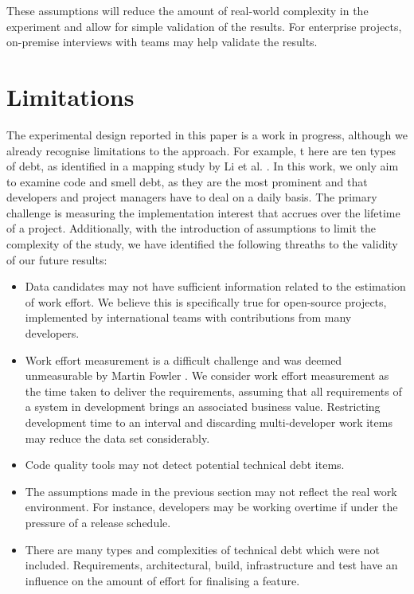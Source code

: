 These assumptions will reduce the amount of real-world complexity in the
experiment and allow for simple validation of the results. For enterprise
projects, on-premise interviews with teams may help validate the results.

\section{Limitations}
\label{limitations}

The experimental design reported in this paper is a work in progress, although
we already recognise limitations to the approach.  For example, t here are ten
types of debt, as identified in a mapping study by Li et al.  \cite{Li2015}. In
this work, we only aim to examine code and smell debt, as they are the most
prominent and that developers and project managers have to deal on a daily
basis. The primary challenge is measuring the implementation interest that
accrues over the lifetime of a project. Additionally, with the introduction of
assumptions to limit the complexity of the study, we have identified the
following threaths to the validity of our future results:

\begin{itemize}
	\item Data candidates may not have sufficient information related to the
	      estimation of work effort. We believe this is specifically true for
	      open-source projects, implemented by international teams with
	      contributions from many developers.
	\item Work effort measurement is a difficult challenge and was deemed
	      unmeasurable by Martin Fowler \cite{CannotMeasureProductivity}. We
	      consider work effort measurement as the time taken to deliver the
	      requirements, assuming that all requirements of a system in
	      development brings an associated business value. Restricting
	      development time to an interval and discarding multi-developer work
	      items may reduce the data set considerably.
	\item Code quality tools may not detect potential technical debt items.
	\item The assumptions made in the previous section may not reflect the
	      real work environment. For instance, developers may be working
	      overtime if under the pressure of a release schedule.
	\item There are many types and complexities of technical debt which were
	      not included. Requirements, architectural, build, infrastructure and
	      test have an influence on the amount of effort for finalising a
	      feature.
\end{itemize}

